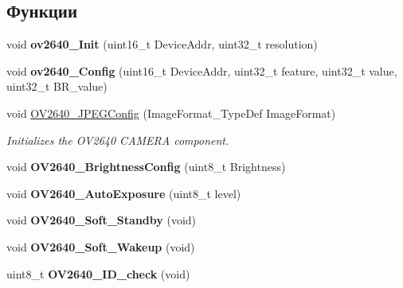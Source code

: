 \subsection*{Функции}
\begin{DoxyCompactItemize}
\item 
\mbox{\label{group___o_v2640___exported___functions_ga4f4e3d4382932ad47f2c30e2461a8355}} 
void {\bfseries ov2640\+\_\+\+Init} (uint16\+\_\+t Device\+Addr, uint32\+\_\+t resolution)
\item 
\mbox{\label{group___o_v2640___exported___functions_ga942828d9066961933f178394521e95cf}} 
void {\bfseries ov2640\+\_\+\+Config} (uint16\+\_\+t Device\+Addr, uint32\+\_\+t feature, uint32\+\_\+t value, uint32\+\_\+t B\+R\+\_\+value)
\item 
void \hyperlink{group___o_v2640___exported___functions_gab8212120406cb75db2b159188d708160}{O\+V2640\+\_\+\+J\+P\+E\+G\+Config} (Image\+Format\+\_\+\+Type\+Def Image\+Format)
\begin{DoxyCompactList}\small\item\em Initializes the O\+V2640 C\+A\+M\+E\+RA component. \end{DoxyCompactList}\item 
\mbox{\label{group___o_v2640___exported___functions_ga481ceacfba870cbd2566b1cc2a243bb7}} 
void {\bfseries O\+V2640\+\_\+\+Brightness\+Config} (uint8\+\_\+t Brightness)
\item 
\mbox{\label{group___o_v2640___exported___functions_ga5dfda64dfd5f9d8b21c2433c7e1e42fe}} 
void {\bfseries O\+V2640\+\_\+\+Auto\+Exposure} (uint8\+\_\+t level)
\item 
\mbox{\label{group___o_v2640___exported___functions_ga2a1ea5c5164eaaee2367100fc31fd4ad}} 
void {\bfseries O\+V2640\+\_\+\+Soft\+\_\+\+Standby} (void)
\item 
\mbox{\label{group___o_v2640___exported___functions_gaa5edc1649dc35f3a8cb975921b9e59c8}} 
void {\bfseries O\+V2640\+\_\+\+Soft\+\_\+\+Wakeup} (void)
\item 
\mbox{\label{group___o_v2640___exported___functions_gaba6fd377ed3b31798b6dbf0315957bb1}} 
uint8\+\_\+t {\bfseries O\+V2640\+\_\+\+I\+D\+\_\+check} (void)
\end{DoxyCompactItemize}

